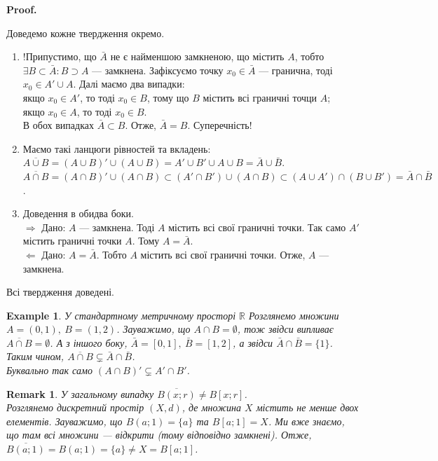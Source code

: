 \documentclass[a4paper, 10pt]{article}
\makeatletter
\def\rightproof{$\boxed{\Rightarrow}$ }
\def\leftproof{$\boxed{\Leftarrow}$ }
\theoremstyle{theoremdd}
\theoremstyle{theoremdd}
\theoremstyle{theoremdd}
\theoremstyle{theoremdd}
\newtheorem{example}[theorem]{Example}
\theoremstyle{theoremdd}
\theoremstyle{theoremdd}
\newtheorem{remark}[theorem]{Remark}
\theoremstyle{theoremdd}
\theoremstyle{theoremdd}
\renewenvironment{proof}[1][Proof.\\]{\par
\pushQED{\hfill \qed}%
\normalfont \topsep6\p@\@plus6\p@\relax
\trivlist
\item\relax
{\bfseries
#1\@addpunct{.}}\hspace\labelsep\ignorespaces
}{%
\popQED\endtrivlist\@endpefalse
}
\makeatother
\begin{document}
\begin{proof}
Доведемо кожне твердження окремо.
\begin{enumerate}[wide=0pt, label={\arabic*)}]
\item !Припустимо, що $\bar{A}$ не є найменшою замкненою, що містить $A$, тобто $\exists B \subset \bar{A}: B \supset A$ --- замкнена. Зафіксуємо точку $x_0 \in \bar{A}$ --- гранична, тоді $x_0 \in A' \cup A$. Далі маємо два випадки:\\
якщо $x_0 \in A'$, то тоді $x_0 \in B$, тому що $B$ містить всі граничні точци $A$;\\
якщо $x_0 \in A$, то тоді $x_0 \in B$.\\
В обох випадках $\bar{A} \subset B$. Отже, $\bar{A} = B$. Суперечність!

\item Маємо такі ланцюги рівностей та вкладень:\\
$\overline{A \cup B} = (A \cup B)' \cup (A \cup B) = A' \cup B' \cup A \cup B = \bar{A} \cup \bar{B}$.\\
$\overline{A \cap B} = (A \cap B)' \cup (A \cap B) \subset (A' \cap B') \cup (A \cap B) \subset (A \cup A') \cap (B \cup B') = \bar{A} \cap \bar{B}$.

\item Доведення в обидва боки.\\
\rightproof Дано: $A$ --- замкнена. Тоді $A$ містить всі свої граничні точки. Так само $A'$ містить граничні точки $A$. Тому $A = \bar{A}$.\\
\leftproof Дано: $A = \bar{A}$. Тобто $A$ містить всі свої граничні точки. Отже, $A$ --- замкнена.
\end{enumerate}
Всі твердження доведені.
\end{proof}

\begin{example}
У стандартному метричному просторі $\mathbb{R}$ Розглянемо множини $A = (0,1),\ B = (1,2)$. Зауважимо, що $A \cap B = \emptyset$, тож звідси випливає $\overline{A \cap B} = \emptyset$. А з іншого боку, $\bar{A} = [0,1],\ \bar{B} = [1,2]$, а звідси $\bar{A} \cap \bar{B} = \{1\}$.\\
Таким чином, $\overline{A \cap B} \subsetneq \bar{A} \cap \bar{B}$.\\
Буквально так само $(A \cap B)' \subsetneq A' \cap B'$.
\end{example}

\begin{remark}
У загальному випадку $\overline{B(x;r)} \neq B[x;r]$.\\
Розглянемо дискретний простір $(X,d)$, де множина $X$ містить не менше двох елементів. Зауважимо, що $B(a;1) = \{a\}$ та $B[a;1] = X$. Ми вже знаємо, що там всі множини --- відкрити (тому відповідно замкнені). Отже, $\overline{B(a;1)} = B(a;1) = \{a\} \neq X = B[a;1]$.
\end{remark}
\end{document}
